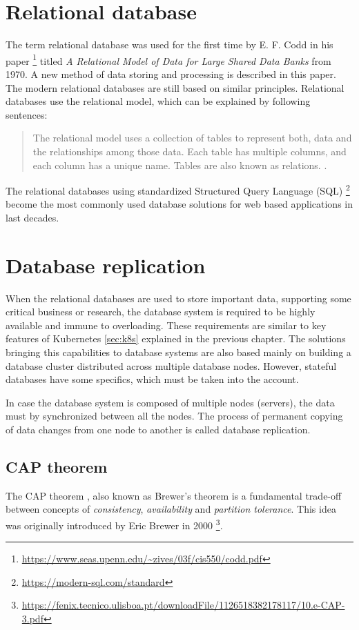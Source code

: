 \documentclass[
  digital, %
  twoside, %
  table,   %
  lof,     %
  lot,     %
]{fithesis3}
\begin{document}
\section{Relational database}
The term relational database was used for the first time by E. F. Codd in his paper \footnote{\url{https://www.seas.upenn.edu/~zives/03f/cis550/codd.pdf}} titled \textit{A Relational Model of Data for Large Shared Data Banks} from 1970. A new method of data storing and processing is described in this paper. The modern relational databases are still based on similar principles. Relational databases use the relational model, which can be explained by following sentences:
\begin{quote}
The relational model uses a collection of tables to represent both, data and the relationships among those data. Each table has multiple columns, and each column has a unique name. Tables are also known as relations. \cite[p. 9]{db}.
\end{quote}

The relational databases using standardized Structured Query Language (SQL) \footnote{\url{https://modern-sql.com/standard}} become the most commonly used database solutions for web based applications in last decades.

\section{Database replication} \label{sec:db_replication}
When the relational databases are used to store important data, supporting some critical business or research, the database system is required to be highly available and immune to overloading. These requirements are similar to key features of Kubernetes \ref{sec:k8s} explained in the previous chapter. The solutions bringing this capabilities to database systems are also based mainly on building a database cluster distributed across multiple database nodes. However, stateful databases have some specifics, which must be taken into the account.

In case the database system is composed of multiple nodes (servers), the data must by synchronized between all the nodes. The process of permanent copying of data changes from one node to another is called database replication.

\subsection{CAP theorem}
The CAP theorem \cite{cap}, also known as Brewer's theorem is a fundamental trade-off between concepts of \textit{consistency}, \textit{availability} and \textit{partition tolerance}. This idea was originally introduced by Eric Brewer in 2000 \footnote{\url{https://fenix.tecnico.ulisboa.pt/downloadFile/1126518382178117/10.e-CAP-3.pdf}}.
\end{document}
